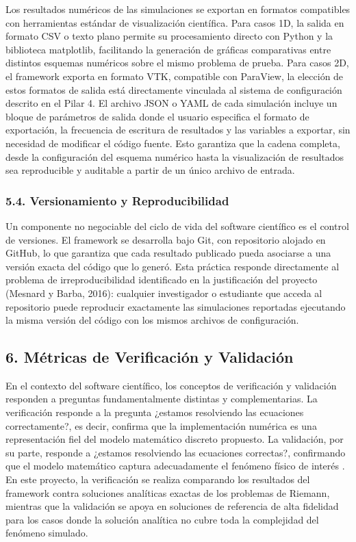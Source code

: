 \documentclass[11pt,openany]{book}
\begin{document}
Los resultados numéricos de las simulaciones se exportan en formatos compatibles con herramientas estándar de visualización científica. Para casos 1D, la salida en formato CSV o texto plano permite su procesamiento directo con Python y la biblioteca matplotlib, facilitando la generación de gráficas comparativas entre distintos esquemas numéricos sobre el mismo problema de prueba. Para casos 2D, el framework exporta en formato VTK, compatible con ParaView, la elección de estos formatos de salida está directamente vinculada al sistema de configuración descrito en el Pilar 4. El archivo JSON o YAML de cada simulación incluye un bloque de parámetros de salida donde el usuario especifica el formato de exportación, la frecuencia de escritura de resultados y las variables a exportar, sin necesidad de modificar el código fuente. Esto garantiza que la cadena completa, desde la configuración del esquema numérico hasta la visualización de resultados sea reproducible y auditable a partir de un único archivo de entrada.

\subsubsection{5.4. Versionamiento y Reproducibilidad}\textbf{}

Un componente no negociable del ciclo de vida del software científico es el control de versiones. El framework se desarrolla bajo Git, con repositorio alojado en GitHub, lo que garantiza que cada resultado publicado pueda asociarse a una versión exacta del código que lo generó. Esta práctica responde directamente al problema de irreproducibilidad identificado en la justificación del proyecto (Mesnard y Barba, 2016): cualquier investigador o estudiante que acceda al repositorio puede reproducir exactamente las simulaciones reportadas ejecutando la misma versión del código con los mismos archivos de configuración.

\subsection{6. Métricas de Verificación y Validación }

En el contexto del software científico, los conceptos de verificación y validación responden a preguntas fundamentalmente distintas y complementarias. La verificación responde a la pregunta ¿estamos resolviendo las ecuaciones correctamente?, es decir, confirma que la implementación numérica es una representación fiel del modelo matemático discreto propuesto. La validación, por su parte, responde a ¿estamos resolviendo las ecuaciones correctas?, confirmando que el modelo matemático captura adecuadamente el fenómeno físico de interés \parencite{oberkampf2010verification}. En este proyecto, la verificación se realiza comparando los resultados del framework contra soluciones analíticas exactas de los problemas de Riemann, mientras que la validación se apoya en soluciones de referencia de alta fidelidad para los casos donde la solución analítica no cubre toda la complejidad del fenómeno simulado.
\end{document}
